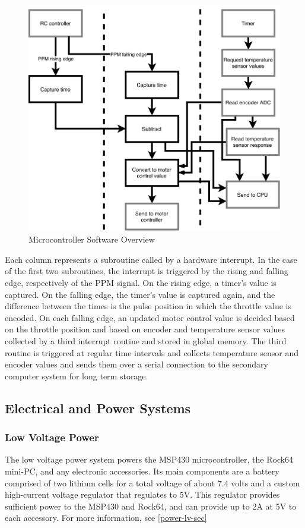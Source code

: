 \documentclass[titlepage, letterpaper,12pt]{article}
\begin{document}
\begin{figure}[!htbp]\centering
\includegraphics{mcusoftware.pdf}
\caption{Microcontroller Software Overview}
\label{mcu-sw}
\end{figure}

Each column represents a subroutine called by a hardware interrupt. In the case of the first two subroutines, the interrupt is triggered by the rising and falling edge, respectively of the PPM signal. On  the rising edge, a timer's value is captured. On the falling edge, the timer's value is captured again, and the difference between the times is the pulse position in which the throttle value is encoded. On each falling edge, an updated motor control value is decided based on the throttle position and based on encoder and temperature sensor values collected by a third interrupt routine and stored in global memory. The third routine is triggered at regular time intervals and collects temperature sensor and encoder values and sends them over a serial connection to the secondary computer system for long term storage.
\subsection{Electrical and Power Systems}
\subsubsection{Low Voltage Power}
The low voltage power system powers the MSP430 microcontroller, the Rock64 mini-PC, and any electronic accessories. Its main components are a battery comprised of two lithium cells for a total voltage of about 7.4 volts and a custom high-current voltage regulator that regulates to 5V. This regulator provides sufficient power to the MSP430 and Rock64, and can provide up to 2A at 5V to each accessory. For more information, see \ref{power-lv-sec}
\end{document}
